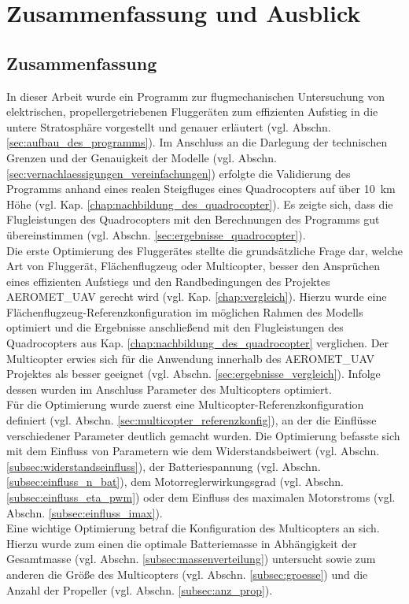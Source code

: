 \chapter{Zusammenfassung und Ausblick}

\section{Zusammenfassung}
In dieser Arbeit wurde ein Programm zur flugmechanischen Untersuchung von elektrischen, propellergetriebenen Fluggeräten zum effizienten Aufstieg in die untere Stratosphäre vorgestellt und genauer erläutert (vgl. Abschn. \ref{sec:aufbau_des_programms}). Im Anschluss an die Darlegung der technischen Grenzen und der Genauigkeit der Modelle (vgl. Abschn. \ref{sec:vernachlaessigungen_vereinfachungen}) erfolgte die Validierung des Programms anhand eines realen Steigfluges eines Quadrocopters auf über \SI{10}{km} Höhe (vgl. Kap. \ref{chap:nachbildung_des_quadrocopter}). Es zeigte sich, dass die Flugleistungen des Quadrocopters mit den Berechnungen des Programms gut übereinstimmen (vgl. Abschn. \ref{sec:ergebnisse_quadrocopter}). \\
Die erste Optimierung des Fluggerätes stellte die grundsätzliche Frage dar, welche Art von Fluggerät, Flächenflugzeug oder Multicopter, besser den Ansprüchen eines effizienten Aufstiegs und den Randbedingungen des Projektes AEROMET\_UAV gerecht wird (vgl. Kap. \ref{chap:vergleich}). Hierzu wurde eine Flächenflugzeug-Referenzkonfiguration im möglichen Rahmen des Modells optimiert und die Ergebnisse anschließend mit den Flugleistungen des Quadrocopters aus Kap. \ref{chap:nachbildung_des_quadrocopter} verglichen. Der Multicopter erwies sich für die Anwendung innerhalb des AEROMET\_UAV Projektes als besser geeignet (vgl. Abschn. \ref{sec:ergebnisse_vergleich}). Infolge dessen wurden im Anschluss Parameter des Multicopters optimiert. \\
Für die Optimierung wurde zuerst eine Multicopter-Referenzkonfiguration definiert (vgl. Abschn. \ref{sec:multicopter_referenzkonfig}), an der die Einflüsse verschiedener Parameter deutlich gemacht wurden. Die Optimierung befasste sich mit dem Einfluss von Parametern wie dem Widerstandsbeiwert (vgl. Abschn. \ref{subsec:widerstandseinfluss}), der Batteriespannung (vgl. Abschn. \ref{subsec:einfluss_n_bat}), dem Motorreglerwirkungsgrad (vgl. Abschn. \ref{subsec:einfluss_eta_pwm}) oder dem Einfluss des maximalen Motorstroms (vgl. Abschn. \ref{subsec:einfluss_imax}).\\
Eine wichtige Optimierung betraf die Konfiguration des Multicopters an sich. Hierzu wurde zum einen die optimale Batteriemasse in Abhängigkeit der Gesamtmasse (vgl. Abschn. \ref{subsec:massenverteilung}) untersucht sowie zum anderen die Größe des Multicopters (vgl. Abschn. \ref{subsec:groesse}) und die Anzahl der Propeller (vgl. Abschn. \ref{subsec:anz_prop}). 
